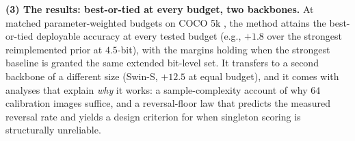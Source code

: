 \smallskip
\noindent\textbf{(3) The results: best-or-tied at every budget, two backbones.}
At matched parameter-weighted budgets on COCO 5k \cite{coco}, the method
attains the best-or-tied deployable accuracy at every tested budget
(e.g., $+1.8$ over the strongest reimplemented prior at $4.5$-bit), with
the margins holding when the strongest baseline is granted the same
extended bit-level set. It transfers to a second backbone of a different
size (Swin-S, $+12.5$ at equal budget), and it comes with analyses that
explain \emph{why} it works: a sample-complexity account of why $64$
calibration images suffice, and a reversal-floor law that predicts the
measured reversal rate and yields a design criterion for when singleton
scoring is structurally unreliable.
